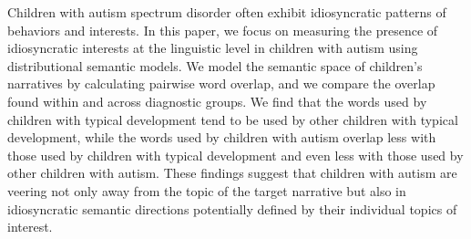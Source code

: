 Children with autism spectrum disorder often exhibit idiosyncratic patterns of behaviors and interests. In this paper, we focus on measuring the presence of idiosyncratic interests at the linguistic level in children with autism using distributional semantic models. We model the semantic space of children's narratives by calculating pairwise word overlap, and we compare the overlap found within and across diagnostic groups. We find that the words used by children with typical development tend to be used by other children with typical development, while the words used by children with autism overlap less with those used by children with typical development and even less with those used by other children with autism. These findings suggest that children with autism are veering not only away from the topic of the target narrative but also in idiosyncratic semantic directions potentially defined by their individual topics of interest.
